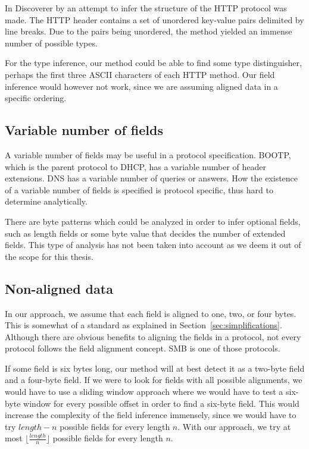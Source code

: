 \documentclass[a4paper]{report}
\begin{document}
In Discoverer by \citeauthor{cui07} an attempt to infer the structure of
the HTTP protocol was made. The HTTP header contains a set of unordered
key-value pairs delimited by line breaks. Due to the pairs being unordered,
the method yielded an immense number of possible types.

For the type inference, our method could be able to find some type
distinguisher, perhaps the first three ASCII characters of each HTTP method.
Our field inference would however not work, since we are assuming aligned
data in a specific ordering.

\subsection{Variable number of fields}
A variable number of fields may be useful in a protocol specification. BOOTP,
which is the parent protocol to DHCP, has a variable number of header 
extensions. DNS has a variable number of queries or answers. How the existence
of a variable number of fields is specified is protocol specific, thus hard to
determine analytically.

There are byte patterns which could be analyzed in order to infer optional
fields, such as length fields or some byte value that decides the number of
extended fields. This type of analysis has not been taken into account as we
deem it out of the scope for this thesis.

\subsection{Non-aligned data}
In our approach, we assume that each field is aligned to one, two, or four
bytes. This is somewhat of a standard as explained in
Section~\ref{sec:simplifications}. Although there are obvious benefits to
aligning the fields in a protocol, not every protocol follows the field
alignment concept. SMB is one of those protocols.

If some field is six bytes long, our method will at best detect it as a
two-byte field and a four-byte field. If we were to look for fields with
all possible alignments, we would have to use a sliding window approach where
we would have to test a six-byte window for every possible offset in order
to find a six-byte field. This would increase the complexity of the field
inference immensely, since we would have to try $length - n$ possible fields
for every length $n$. With our approach, we try at most
$\lfloor \frac{length}{n} \rfloor$ possible fields for every length $n$.
\end{document}
